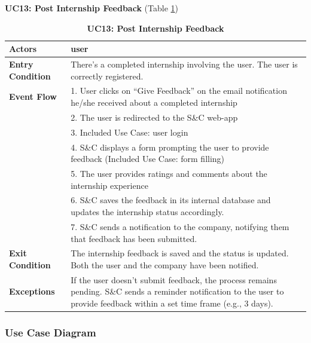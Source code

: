 \textbf{UC13: Post Internship Feedback }(Table \ref{tab:UC13})
\begin{table}[H]
\centering
\caption{\textbf{UC13: Post Internship Feedback}}
\label{tab:UC13}
\begin{tabularx}{\textwidth}{|X|X|}
\hline
\textbf{Actors}           & user                                                       \\ \hline
\textbf{Entry Condition}   & There’s a completed internship involving the user. The user is correctly registered. \\ \hline
\textbf{Event Flow}        & 1. User clicks on “Give Feedback” on the email notification he/she received about a completed internship \\
                           & 2. The user is redirected to the S\&C web-app \\
                           & 3. Included Use Case: user login \\
                           & 4. S\&C displays a form prompting the user to provide feedback (Included Use Case: form filling) \\
                           & 5. The user provides ratings and comments about the internship experience \\
                           & 6. S\&C saves the feedback in its internal database and updates the internship status accordingly. \\
                           & 7. S\&C sends a notification to the company, notifying them that feedback has been submitted. \\ \hline
\textbf{Exit Condition}    & The internship feedback is saved and the status is updated. Both the user and the company have been notified. \\ \hline
\textbf{Exceptions}        & If the user doesn’t submit feedback, the process remains pending. S\&C sends a reminder notification to the user to provide feedback within a set time frame (e.g., 3 days). \\ \hline
\end{tabularx}
\end{table}

\clearpage
\subsubsection{Use Case Diagram}


